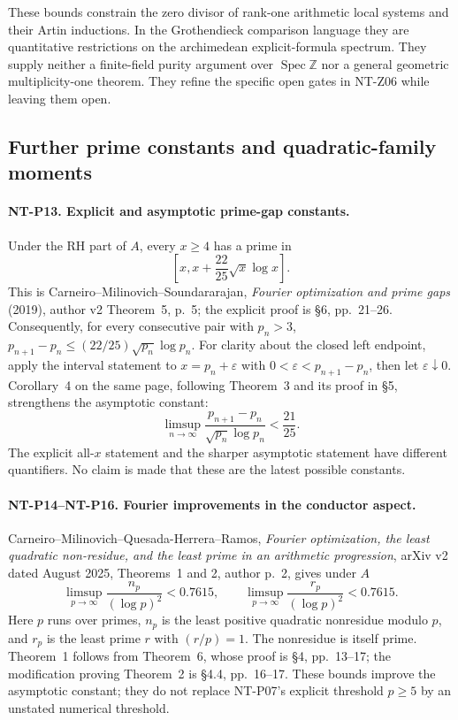 These bounds constrain the zero divisor of rank-one arithmetic
local systems and their Artin inductions.  In the Grothendieck
comparison language they are quantitative restrictions on the
archimedean explicit-formula spectrum.  They supply neither a
finite-field purity argument over $\operatorname{Spec}\mathbb Z$
nor a general geometric multiplicity-one theorem.  They refine the
specific open gates in NT-Z06 while leaving them open.

\subsection{Further prime constants and quadratic-family moments}

\paragraph{NT-P13. Explicit and asymptotic prime-gap constants.}
Under the RH part of $A$, every $x\ge4$ has a prime in
\[
 \left[x,x+\frac{22}{25}\sqrt x\log x\right].
\]
This is Carneiro--Milinovich--Soundararajan,
\emph{Fourier optimization and prime gaps} (2019), author v2
Theorem~5, p.~5; the explicit proof is \S6, pp.~21--26.
Consequently, for every consecutive pair with $p_n>3$,
$p_{n+1}-p_n\le(22/25)\sqrt{p_n}\log p_n$.
For clarity about the closed left endpoint, apply the interval
statement to $x=p_n+\varepsilon$ with
$0<\varepsilon<p_{n+1}-p_n$, then let $\varepsilon\downarrow0$.
Corollary~4 on the same page, following Theorem~3 and its proof in
\S5, strengthens the asymptotic constant:
\[
 \limsup_{n\to\infty}
       \frac{p_{n+1}-p_n}{\sqrt{p_n}\log p_n}<\frac{21}{25}.
\]
The explicit all-$x$ statement and the sharper asymptotic statement
have different quantifiers.  No claim is made that these are the
latest possible constants.

\paragraph{NT-P14--NT-P16. Fourier improvements in the conductor aspect.}
Carneiro--Milinovich--Quesada-Herrera--Ramos,
\emph{Fourier optimization, the least quadratic non-residue, and
the least prime in an arithmetic progression}, arXiv v2 dated
August 2025, Theorems~1 and 2, author p.~2, gives under $A$
\[
 \limsup_{p\to\infty}\frac{n_p}{(\log p)^2}<0.7615,
 \qquad
 \limsup_{p\to\infty}\frac{r_p}{(\log p)^2}<0.7615.
\tag{NT-P14}
\]
Here $p$ runs over primes, $n_p$ is the least positive quadratic
nonresidue modulo $p$, and $r_p$ is the least prime $r$ with
$(r/p)=1$.  The nonresidue is itself prime.  Theorem~1 follows from
Theorem~6, whose proof is \S4, pp.~13--17; the modification proving
Theorem~2 is \S4.4, pp.~16--17.  These bounds improve the
asymptotic constant; they do not replace NT-P07's explicit threshold
$p\ge5$ by an unstated numerical threshold.

